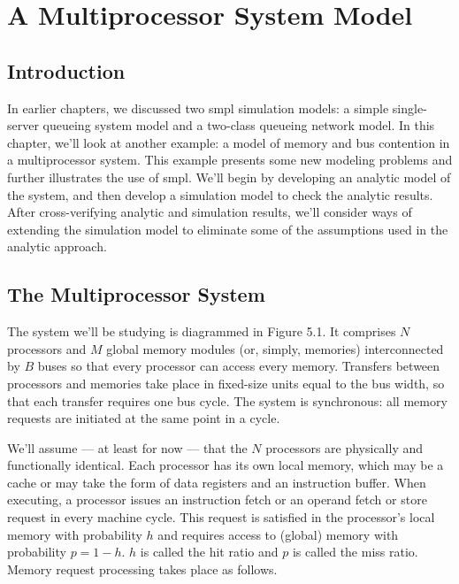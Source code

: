 \chapter{A Multiprocessor System Model}
\label{chap:multiprocessor-system}

\section{Introduction}
\label{sec:mp-introduction}

In earlier chapters, we discussed two smpl simulation models: a simple
single-server queueing system model and a two-class queueing network model.
In this chapter, we'll look at another example: a model of memory and bus
contention in a multiprocessor system. This example presents some new
modeling problems and further illustrates the use of smpl. We'll begin by
developing an analytic model of the system, and then develop a simulation
model to check the analytic results. After cross-verifying analytic and
simulation results, we'll consider ways of extending the simulation model to
eliminate some of the assumptions used in the analytic approach.

\section{The Multiprocessor System}
\label{sec:mp-system}

The system we'll be studying is diagrammed in Figure 5.1. It comprises $N$
processors and $M$ global memory modules (or, simply, memories)
interconnected by $B$ buses so that every processor can access every memory.
Transfers between processors and memories take place in fixed-size units
equal to the bus width, so that each transfer requires one bus cycle. The
system is synchronous: all memory requests are initiated at the same point in
a cycle.

We'll assume --- at least for now --- that the $N$ processors are physically
and functionally identical. Each processor has its own local memory, which
may be a cache or may take the form of data registers and an instruction
buffer. When executing, a processor issues an instruction fetch or an operand
fetch or store request in every machine cycle. This request is satisfied in the
processor's local memory with probability $h$ and requires access to (global)
memory with probability $p=1-h$. $h$ is called the hit ratio and $p$ is called
the miss ratio. Memory request processing takes place as follows.

